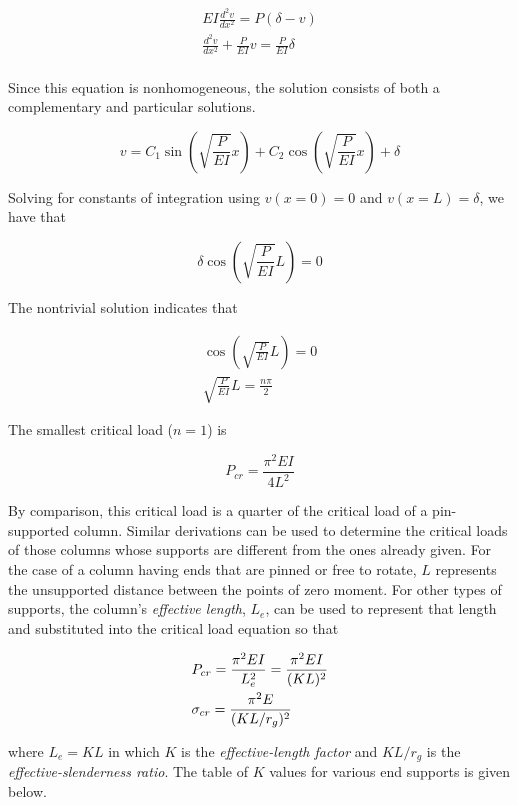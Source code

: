\documentclass[
10pt,
a4paper,
openany,
svgnames,
]{book} %
\begin{document}
\begin{gather*}
  EI\frac{d^2v}{dx^2} = P(\delta  - v) \\ 
  \frac{d^2v}{dx^2} + \frac{P}{EI}v = \frac{P}{EI}\delta  \\ 
\end{gather*}

Since this equation is nonhomogeneous, the solution consists of both a complementary and particular solutions.

\[v = C_1\sin \left( \sqrt {\frac{P}{EI}} x \right) + C_2\cos \left( \sqrt {\frac{P}{EI}} x \right) + \delta \]

Solving for constants of integration using $v(x = 0) = 0$ and $v(x = L) = \delta$, we have that

\[\delta \cos \left( \sqrt {\frac{P}{EI}} L \right) = 0\]

The nontrivial solution indicates that

\begin{gather*}
  \cos \left( \sqrt {\frac{P}{EI}} L \right) = 0 \\
  \sqrt {\frac{P}{EI}} L = \frac{n\pi }{2}
\end{gather*}

The smallest critical load ($n = 1$) is

\begin{equation}
  P_{cr} = \frac{\pi^2EI}{4L^2}
\end{equation}

By comparison, this critical load is a quarter of the critical load of a pin-supported column. Similar derivations can be used to determine the critical loads of those columns whose supports are different from the ones already given. For the case of a column having ends that are pinned or free to rotate, $L$ represents the unsupported distance between the points of zero moment. For other types of supports, the column’s \emph{effective length}, $L_e$, can be used to represent that length and substituted into the critical load equation so that

\begin{equation} \label{eqn: Euler's formula}
\begin{gathered}
  P_{cr} = \frac{\pi^2EI}{L_e^2} = \frac{\pi ^2EI}{(KL)^2} \hfill \\
  \sigma_{cr} = \frac{\pi ^2E}{(KL/r_g)^2} \hfill \\ 
\end{gathered}
\end{equation}

where $L_e = KL$ in which $K$ is the \emph{effective-length factor} and $KL/r_g$ is the \emph{effective-slenderness ratio}. The table of $K$ values for various end supports is given below.
\end{document}
